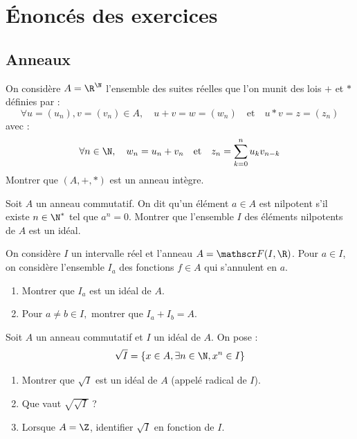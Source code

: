 \section{Énoncés des exercices}
\setcounter{numexo}{15}

\subsection{Anneaux}

\begin{exercice}
On considère $A=\R^{\N}$ l'ensemble des suites réelles que l'on munit des lois $+$ et $*$ définies par : 
\[\forall u=(u_{n}), v=(v_{n}) \in A, \quad u+v=w=(w_{n}) \quad \text{et} \quad u*v=z=(z_{n})\]
avec :
\[\forall n\in\N, \quad w_{n}=u_{n}+v_{n} \quad \text{et} \quad z_{n}=\sum_{k=0}^{n}u_{k}v_{n-k}\]
Montrer que $(A,+,*)$ est un anneau intègre. 
\end{exercice}

\begin{exercice}
Soit $A$ un anneau commutatif. On dit qu'un élément $a\in A$ est nilpotent s'il existe $n\in\N^*$ tel que $a^{n}=0$. 
Montrer que l'ensemble $I$ des éléments nilpotents de $A$ est un idéal. 
\end{exercice}

\begin{exercice}
On considère $I$ un intervalle réel et l'anneau $A=\mathscr F(I,\R)$. 
Pour $a\in I$, on considère l'ensemble $I_{a}$ des fonctions $f\in A$ qui s'annulent en $a$. 
\begin{enumerate}
    \item Montrer que $I_{a}$ est un idéal de $A$. 
    \item Pour $a\ne b\in I,$ montrer que $I_{a}+I_{b}=A$. 
\end{enumerate}
\end{exercice}

\begin{exercice}
Soit $A$ un anneau commutatif et $I$ un idéal de $A$. 
On pose :
\[\sqrt I=\{x\in A,\exists n\in\N,x^{n}\in I\}\]
\begin{enumerate}
    \item Montrer que $\sqrt I$ est un idéal de $A$ (appelé radical de $I$).
    \item Que vaut $\sqrt{\sqrt I}$ ?
    \item Lorsque $A=\Z$, identifier $\sqrt I$ en fonction de $I$. 
\end{enumerate}
\end{exercice}

